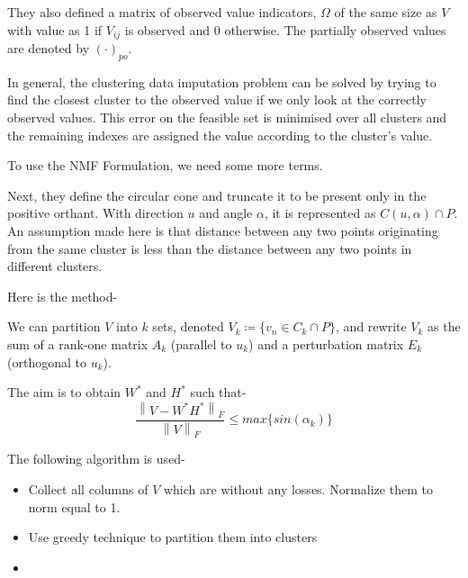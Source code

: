 \documentclass[a4paper,14pt]{article}
\numberwithin{definition}{section}
\numberwithin{mytheorem}{subsection}
\newcommand\norm[1]{\left\lVert#1\right\rVert}
\begin{document}
They also defined a matrix of observed value indicators, $\Omega$ of the same size as $V$ with value as 1 if $V_{ij}$ is observed and 0 otherwise. The partially observed values are denoted by $(\cdot)_{po}$. 

In general, the clustering data imputation problem can be solved by trying to find the closest cluster to the observed value if we only look at the correctly observed values. This error on the feasible set is minimised over all clusters and the remaining indexes are assigned the value according to the cluster's value.

To use the NMF Formulation, we need some more terms.

Next, they define the circular cone and truncate it to be present only in the positive orthant. With direction $u$ and angle $\alpha$, it is represented as $C(u,\alpha)\cap P$. An assumption made here is that distance between any two points originating from the same cluster is less than the distance between any two points in different clusters.

Here is the method-

We can partition $V$ into $k$ sets, denoted $V_k \coloneqq \lbrace v_n \in C_k \cap P \rbrace$, and rewrite $V_k$ as the sum of a rank-one matrix $A_k$ (parallel to $u_k$) and a perturbation matrix $E_k$ (orthogonal to $u_k$).

The aim is to obtain $W^*$ and $H^*$ such that-
$$\frac{\norm{V - W^*H^*}_F}{\norm{V}_F}\leq max \lbrace sin(\alpha_k)\rbrace $$

The following algorithm is used-
\begin{itemize}
    \item Collect all columns of $V$ which are without any losses. Normalize them to norm equal to 1.
    \item Use greedy technique to partition them into clusters
    \item 
\end{itemize}
\end{document}
